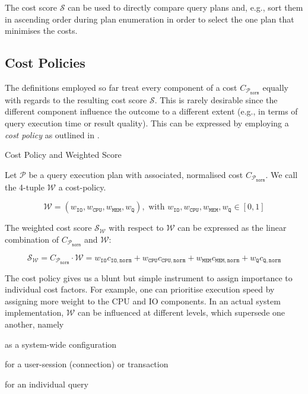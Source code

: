 The cost score $\mathcal{S}$ can be used to directly compare query plans and, e.g., sort them in ascending order during plan enumeration in order to select the one plan that minimises the costs.

\subsection{Cost Policies}

The definitions employed so far treat every component of a cost $C_{\mathcal{P}_{\mathtt{norm}}}$ equally with regards to the resulting cost score $\mathcal{S}$. This is rarely desirable since the different component influence the outcome to a different extent (e.g., in terms of query execution time or result quality). This can be expressed by employing a \emph{cost policy} as outlined in .

\begin{definition}[label=definition:cost_policy]{Cost Policy and Weighted Score}{}

    Let $\mathcal{P}$  be a query execution plan with associated, normalised cost $C_{\mathcal{P}_{\mathtt{norm}}}$. We call the 4-tuple $\mathcal{W}$ a cost-policy.

    \begin{equation*}
        \mathcal{W} = (w_{\mathtt{IO}}, w_{\mathtt{CPU}}, w_{\mathtt{MEM}}, w_{\mathtt{Q}}), \text{ with } w_{\mathtt{IO}},  w_{\mathtt{CPU}}, w_{\mathtt{MEM}}, w_{\mathtt{Q}} \in [0, 1]
    \end{equation*}

   The weighted cost score $\mathcal{S}_{\mathcal{W}}$ with respect to $\mathcal{W}$ can be expressed as the linear combination of $C_{\mathcal{P}_{\mathtt{norm}}}$ and $\mathcal{W}$:

    \begin{equation*}
        \mathcal{S}_{\mathcal{W}} = C_{\mathcal{P}_{\mathtt{norm}}} \cdot \mathcal{W} = w_{\mathtt{IO}}c_{\mathtt{IO},\mathtt{norm}} + w_{\mathtt{CPU}} c_{\mathtt{CPU},\mathtt{norm}} + w_{\mathtt{MEM}} c_{\mathtt{MEM},\mathtt{norm}} + w_{\mathtt{Q}} c_{\mathtt{Q},\mathtt{norm}}
    \end{equation*}
\end{definition}

The cost policy gives us a blunt but simple instrument to assign importance to individual cost factors. For example, one can prioritise execution speed by assigning more weight to the CPU and IO components. In an actual system implementation, $\mathcal{W}$ can be influenced at different levels, which supersede one another, namely 
\begin{enumerate*}[label=(\roman*), itemjoin={{, }}, itemjoin*={{, or }}, after={{.}}]
    \item as a system-wide configuration
    \item for a user-session (connection) or transaction
    \item for an individual query
\end{enumerate*}

